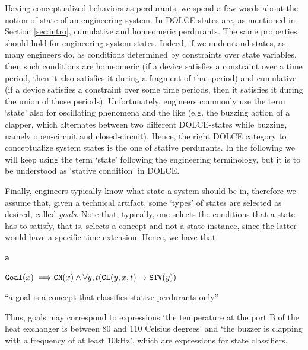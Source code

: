 \documentclass[sw]{iosart2x}
\newcommand{\bflist}{\begin{list}{}{\setlength{\topsep}{2mm}\setlength{\partopsep}{0mm}\setlength{\parsep}{0mm}\setlength{\leftmargin}{9mm}\setlength{\labelwidth}{8mm}}}
\newcommand{\eflist}{\end{list}}
\newcommand{\AxLabel}{\textrm{a}}
\newcounter{cntax}
\newcommand{\myax}[1]{\refstepcounter{cntax}\begin{small}{\bf \AxLabel\thecntax\label{ax:#1}}\end{small}}
\newcommand{\mytext}[1]{``#1''}
\newcommand{\generalStyle}[1]{\texttt{#1}}
\newcommand{\uniRel}[2]{\generalStyle{#1}(#2)}
\newcommand{\triRel}[4]{\generalStyle{#1}(#2,#3,#4)}
\newcommand{\myfi}{\hspace{0.9mm} \Longrightarrow}
\newcommand{\DOLCE}{\textsc{DOLCE}\xspace} %
\newcommand{\DOLCEStative}[1]{\uniRel{{STV}}{#1}}
\newcommand{\DOLCEConcept}[1]{\uniRel{{CN}}{#1}}
\newcommand{\DOLCECLby}[3]{\triRel{CL}{#1}{#2}{#3}}
\newcommand{\Goal}[1]{\uniRel{Goal}{#1}}
\newcommand{\firstTimeKeyWord}[1]{\textit{#1}}
\newcommand{\stateVarCond}[1]{%
  \ifthenelse{\equal{#1}{fullSingular}}{system condition}{%
    \ifthenelse{\equal{#1}{shortSingular}}{condition}{%
      \ifthenelse{\equal{#1}{fullPlural}}{system conditions}{%
        \ifthenelse{\equal{#1}{shortPlural}}{conditions}{%
          ERROR!%
        }%
      }%
    }%
  }%
}
\newcommand{\quotes}[1]{`#1'}
\newcommand{\TODO}[1]{{%
}}
\begin{document}
Having conceptualized behaviors as perdurants, we spend a few words about the notion of state of an engineering system.
In \DOLCE states are, as mentioned in Section \ref{sec:intro}, cumulative and homeomeric perdurants.
The same properties should hold for engineering system states.
Indeed, if we understand states, as many engineers do, as conditions determined by constraints over state variables, then such conditions are homeomeric (if a device satisfies a constraint over a time period, then it also satisfies it during a fragment of that period) and cumulative (if a device satisfies a constraint over some time periods, then it satisfies it during the union of those periods).
Unfortunately, engineers commonly use the term \quotes{state} also for oscillating phenomena and the like (e.g. the buzzing action of a clapper, which alternates between two different \DOLCE-states while buzzing, namely open-circuit and closed-circuit). 
Hence, the right \DOLCE category to conceptualize system states is the one of stative perdurants. 
In the following we will keep using the term \quotes{state} following the engineering terminology, but it is to be understood as \quotes{stative condition} in \DOLCE. %

Finally, engineers typically know what state a system should be in,
therefore we assume that, given a technical artifact, some `types' of states are selected as desired, called \firstTimeKeyWord{goals}. Note that, typically, one selects the conditions that a state has to satisfy, that is, selects a concept 
and not a state-instance, since the latter would have a specific time extension. 
Hence, we have that
\bflist
\item[\myax{goalSubsum}] $ \Goal{x} \myfi \DOLCEConcept{x} \land \forall y,t (\DOLCECLby{y}{x}{t} \to \DOLCEStative{y})$
  \item \mytext{a goal is a concept that classifies stative perdurants only}
\eflist
Thus, goals may correspond to expressions \quotes{the temperature at the port B of the heat exchanger is between 80 and 110 Celsius degrees} and \quotes{the buzzer is clapping with a frequency of at least 10kHz}, which are expressions for state classifiers.


\end{document}
